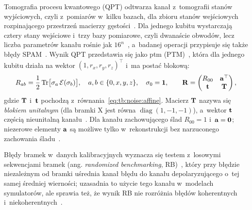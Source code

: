 Tomografia procesu kwantowego (QPT) odtwarza kanał z~tomografii stanów wyjściowych, czyli z~pomiarów w~kilku bazach, dla zbioru stanów wejściowych rozpinającego przestrzeń macierzy gęstości~\cite{bib:quantum_tomography,ChuangNielsen1997,Poyatos1997}.
Dla jednego kubitu wystarczają cztery stany wejściowe i~trzy bazy pomiarowe, czyli dwanaście obwodów, lecz liczba parametrów kanału rośnie jak $16^n$~\cite{NielsenChuang2010,MohseniQPTReview}, a~badanej operacji przypisuje się także błędy SPAM~\cite{Merkel2013}.
Wynik QPT przedstawia się jako \gls{ptm} (PTM)~\cite{greenbaum2015introduction}, która dla jednego kubitu działa na wektor $(1,r_x,r_y,r_z)^{\top}$ i~ma postać blokową:
\begin{equation}\label{eq:tb:noise:ptm-blocks}
R_{ab}=\frac{1}{2}\operatorname{Tr}\bigl[\sigma_a\,\mathcal{E}(\sigma_b)\bigr],\quad a,b\in\{0,x,y,z\},\quad \sigma_0=\mathbf{1},
\qquad
\mathbf{R}=\begin{pmatrix} R_{00} & \mathbf{a}^{\top}\\ \mathbf{t} & \mathbf{T} \end{pmatrix},
\end{equation}
gdzie $\mathbf{T}$ i~$\mathbf{t}$ pochodzą z~równania~\eqref{eq:tb:noise:affine}.
Macierz $\mathbf{T}$ nazywa się \emph{blokiem unitalnym} (dla bramki $\mathrm{X}$ jest równa $\operatorname{diag}(1,-1,-1)$), a~wektor $\mathbf{t}$ częścią nieunitalną kanału~\cite{greenbaum2015introduction,Wallman2015}.
Dla kanału zachowującego ślad $R_{00}=1$ i~$\mathbf{a}=\mathbf{0}$; niezerowe elementy $\mathbf{a}$ są możliwe tylko w~rekonstrukcji bez narzuconego zachowania śladu~\cite{Wallman2015}.

Błędy bramek w~danych kalibracyjnych wyznacza się testem z~losowymi sekwencjami bramek (ang. \emph{randomized benchmarking}, RB)~\cite{Magesan2011,magesan2012characterizing,ibm_calibration_docs_2026}, który przy błędzie niezależnym od bramki uśrednia kanał błędu do kanału depolaryzującego o~tej samej średniej wierności; uzasadnia to użycie tego kanału w~modelach symulatorów, ale sprawia też, że wynik RB nie rozróżnia błędów koherentnych i~niekoherentnych~\cite{Wallman2015,ProctorWhat2017}.
